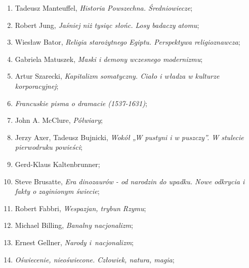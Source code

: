 \documentclass[a4paper,11pt]{article}
\begin{document}
\begin{enumerate}
\item Tadeusz Manteuffel, \textit{Historia Powszechna. Średniowiecze};



\item Robert Jung, \textit{Jaśniej niż tysiąc słońc. Losy badaczy
    atomu};



\item Wiesław Bator, \textit{Religia starożytnego Egiptu. Perspektywa
    religioznawcza};



\item Gabriela Matuszek, \textit{Maski i demony wczesnego modernizmu};



\item Artur Szarecki, \textit{Kapitalizm somatyczny. Ciało i władza w
    kulturze korporacyjnej};



\item \textit{Francuskie pisma o dramacie (1537-1631)};



\item John A. McClure, \textit{Półwiary};



\item Jerzy Axer, Tadeusz Bujnicki, \textit{Wokół „W pustyni i w
    puszczy”. W stulecie pierwodruku powieści};



\item Gerd-Klaus Kaltenbrunner;



\item Steve Brusatte, \textit{Era dinozaurów - od narodzin do upadku.
    Nowe odkrycia i fakty o zaginionym świecie};



\item Robert Fabbri, \textit{Wespazjan, trybun Rzymu};



\item Michael Billing, \textit{Banalny nacjonalizm};



\item Ernest Gellner, \textit{Narody i~nacjonalizm};



\item \textit{Oświecenie, nieoświecone. Człowiek, natura, magia};




\end{enumerate}
\end{document}
